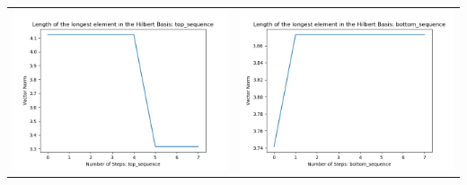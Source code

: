 \documentclass[10pt]{article}
\begin{document}
\begin{tabular}{c|c}
\begin{minipage}{.4\textwidth}
\includegraphics[width=\textwidth]{"DATA/5d/5 generators 2 bound A/top_sequence LENGTH"}
\end{minipage} &
\begin{minipage}{.4\textwidth}
\includegraphics[width=\textwidth]{"DATA/5d/5 generators 2 bound A bottomup/bottom_sequence LENGTH"}
\end{minipage}
\end{tabular}
\end{document}
